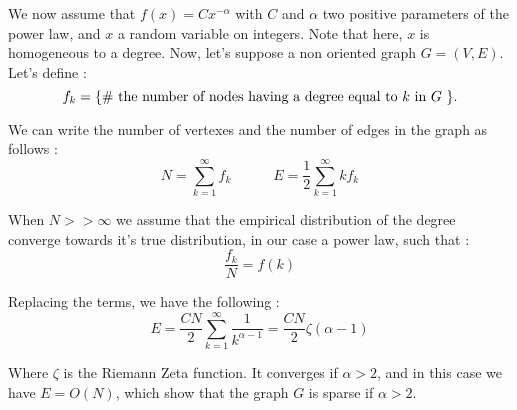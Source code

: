 \documentclass[a4paper, 12pt]{article}
\begin{document}
We now assume that $f(x) = C x^{- \alpha}$ with $C$ and $\alpha$ two positive parameters of the power law, and $x$ a random variable on integers. Note that here,  $x$ is homogeneous to a degree. Now, let's suppose a non oriented graph $G=(V,E)$. Let's define :
\begin{equation}
    f_k =  \textnormal{\{\# the number of nodes  having a degree equal to $k$ in $G$ \}}.
\end{equation}

We can write the number of vertexes and the number of edges in the graph as follows :
\begin{equation}
    N = \sum_{k=1}^\infty f_k  \quad\qquad E = \frac{1}{2}\sum_{k=1}^\infty k f_k
\end{equation}

When $N >> \infty$ we assume that the empirical distribution of the degree converge towards it's true distribution, in our case a power law, such that :
\begin{equation}
    \frac{f_k}{N} = f(k)
\end{equation}

Replacing the terms, we have the following :
\begin{equation} \label{eq:e_zeta}
    E = \frac{CN}{2}\sum_{k=1}^\infty\frac{1}{k^{\alpha-1}} = \frac{CN}{2} \zeta(\alpha-1)
\end{equation}

Where $\zeta$ is the Riemann Zeta function. It converges if $\alpha > 2$, and in this case we have $E = O(N)$, which show that the graph $G$ is sparse if $\alpha > 2$.



\end{document}
